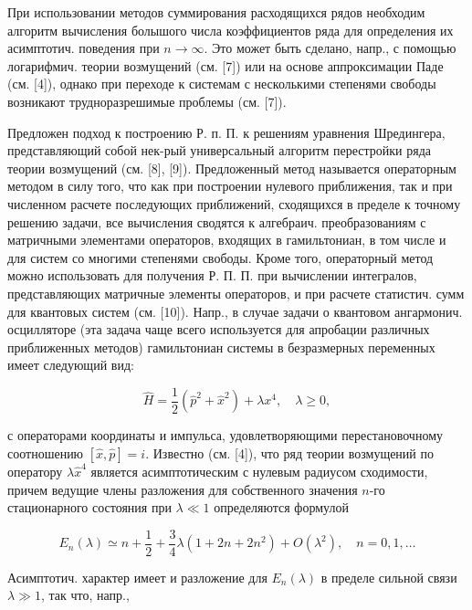 \documentclass[10pt]{article}
\begin{document}
При использовании методов суммирования расходящихся рядов необходим алгоритм вычисления болышого числа коэффициентов ряда для определения их асимптотич. поведения при $n \rightarrow \infty$. Это может быть сделано, напр., с помощью логарифмич. теории возмущений (см. [7]) или на основе аппроксимации Паде (см. [4]), однако при переходе к системам с несколькими степенями свободы возникают трудноразрешимые проблемы (см. [7]).



Предложен подход к построению Р. п. П. к решениям уравнения Шредингера, представляющий собой нек-рый универсальный алгоритм перестройки ряда теории возмущений (см. [8], [9]). Предложенный метод называется операторным методом в силу того, что как при построении нулевого приближения, так и при численном расчете последующих приближений, сходящихся в пределе к точному решению задачи, все вычисления сводятся к алгебраич. преобразованиям с матричными элементами операторов, входящих в гамильтониан, в том числе и для систем со многими степенями свободы. Кроме того, операторный метод можно использовать для получения Р. П. П. при вычислении интегралов, представляющих матричные элементы операторов, и при расчете статистич. сумм для квантовых систем (см. [10]). Напр., в случае задачи о квантовом ангармонич. осцилляторе (эта задача чаще всего используется для апробации различных приближенных методов) гамильтониан системы в безразмерных переменных имеет следующий вид:



\[

\hat{H}=\frac{1}{2}\left(\hat{p}^{2}+\hat{x}^{2}\right)+\lambda x^{4}, \quad \lambda \geqslant 0,

\]



с операторами координаты и импульса, удовлетворяющими перестановочному соотношению $[\hat{x}, \hat{p}]=i$. Известно (см. [4]), что ряд теории возмущений по оператору $\lambda \hat{x}^{4}$ является асимптотическим с нулевым радиусом сходимости, причем ведущие члены разложения для собственного значения $n$-го стационарного состояния при $\lambda \ll 1$ определяются формулой



\[

E_{n}(\lambda) \simeq n+\frac{1}{2}+\frac{3}{4} \lambda\left(1+2 n+2 n^{2}\right)+O\left(\lambda^{2}\right), \quad n=0,1, \ldots

\]



Асимптотич. характер имеет и разложение для $E_{n}(\lambda)$ в пределе сильной связи $\lambda \gg 1$, так что, напр.,
\end{document}
